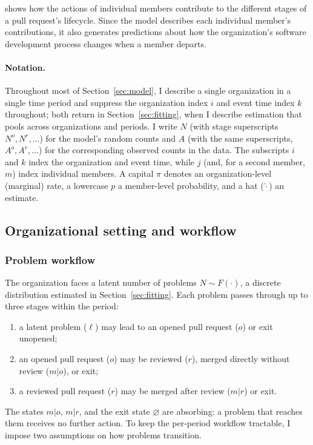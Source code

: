 \documentclass[12pt,notitlepage]{article}
\begin{document}
shows how the actions of individual members contribute to the different stages of a pull request's lifecycle. 
Since the model describes each individual member's contributions, it also generates predictions about how the organization's software development process changes when a member departs. 



\paragraph{Notation.}
Throughout most of Section~\ref{sec:model}, I describe a single organization in a single time period and suppress the organization index $i$ and event time index $k$ throughout; both return in Section~\ref{sec:fitting}, when I describe estimation that pools across organizations and periods.
I write $N$ (with stage superscripts $N^o, N^r, \dots$) for the model's random counts and $A$ (with the same superscripts, $A^o, A^r, \dots$) for the corresponding observed counts in the data.
The subscripts $i$ and $k$ index the organization and event time, while $j$ (and, for a second member, $m$) index individual members.
A capital $\pi$ denotes an organization-level (marginal) rate, a lowercase $p$ a member-level probability, and a hat ($\hat\cdot$) an estimate.


\subsection{Organizational setting and workflow}

\subsubsection{Problem workflow}
The organization faces a latent number of problems $N \sim F(\cdot)$, a discrete distribution estimated in Section~\ref{sec:fitting}.
Each problem passes through up to three stages within the period:
\begin{enumerate}
    \item a latent problem ($\ell$) may lead to an opened pull request ($o$) or exit unopened;
    \item an opened pull request ($o$) may be reviewed ($r$), merged directly without review ($m|o$), or exit;
    \item a reviewed pull request ($r$) may be merged after review ($m|r$) or exit.
\end{enumerate}
The states $m|o$, $m|r$, and the exit state $\varnothing$ are absorbing: a problem that reaches them receives no further action.
To keep the per-period workflow tractable, I impose two assumptions on how problems transition.
\end{document}
